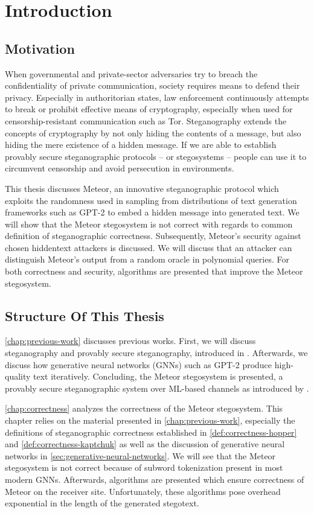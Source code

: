 \chapter{Introduction}

\section{Motivation}

When governmental and private-sector adversaries try to breach the confidentiality of private communication, society requires means to defend their privacy.
Especially in authoritorian states, law enforcement continuously attempts to break or prohibit effective means of cryptography, especially when used for censorship-resistant communication such as Tor.
Steganography extends the concepts of cryptography by not only hiding the contents of a message, but also hiding the mere existence of a hidden message.
If we are able to establish provably secure steganographic protocols -- or stegosystems -- people can use it to circumvent censorship and avoid persecution in environments.

This thesis discusses Meteor, an innovative steganographic protocol which exploits the randomness used in sampling from distributions of text generation frameworks such as GPT-2 to embed a hidden message into generated text.
We will show that the Meteor stegosystem is not correct with regards to common definition of steganographic correctness.
Subsequently, Meteor's security against chosen hiddentext attackers is discussed.
We will discuss that an attacker can distinguish Meteor's output from a random oracle in polynomial queries.
For both correctness and security, algorithms are presented that improve the Meteor stegosystem.



\section{Structure Of This Thesis}

\autoref{chap:previous-work} discusses previous works.
First, we will discuss steganography and provably secure steganography, introduced in \cite{Hopper2004}.
Afterwards, we discuss how generative neural networks (GNNs) such as GPT-2 produce high-quality text iteratively.
Concluding, the Meteor stegosystem is presented, a provably secure steganographic system over ML-based channels as introduced by \cite{Meteor2021}.

\autoref{chap:correctness} analyzes the correctness of the Meteor stegosystem. 
This chapter relies on the material presented in \autoref{chap:previous-work}, especially the definitions of steganographic correctness established in \autoref{def:correctness-hopper} and \autoref{def:correctness-kaptchuk} as well as the discussion of generative neural networks in \autoref{sec:generative-neural-networks}.
We will see that the Meteor stegosystem is not correct because of subword tokenization present in most modern GNNs.
Afterwards, algorithms are presented which ensure correctness of Meteor on the receiver site.
Unfortunately, these algorithms pose overhead exponential in the length of the generated stegotext.

